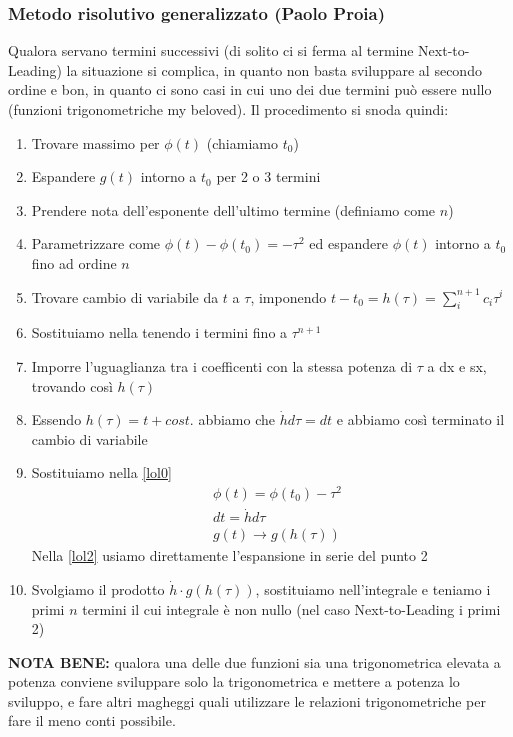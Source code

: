 \subsubsection{Metodo risolutivo generalizzato (Paolo Proia)}

Qualora servano termini successivi (di solito ci si ferma al termine Next-to-Leading) la situazione si complica, in quanto non basta sviluppare al secondo ordine e bon, in quanto ci sono casi in cui uno dei due termini può essere nullo (funzioni trigonometriche my beloved). Il procedimento si snoda quindi:
\begin{enumerate}
	\item Trovare massimo per \(\phi(t)\) (chiamiamo \(t_0\))
	\item Espandere \(g(t)\) intorno a \(t_0\) per 2 o 3 termini
	\item Prendere nota dell'esponente dell'ultimo termine (definiamo come  \(n\)) 
	\item Parametrizzare come $\phi(t) - \phi(t_0)=-\tau^2 \label{lol1}$
	ed espandere \(\phi(t)\) intorno a $t_0$ fino ad ordine \(n\)
	\item Trovare cambio di variabile da \(t\) a \(\tau\), imponendo $t - t_0 = h(\tau) = \sum_i^{n+1} c_i \tau^i$
	\item Sostituiamo nella  tenendo i termini fino a \(\tau^{n+1}\)
	\item Imporre l'uguaglianza tra i coefficenti con la stessa potenza di \(\tau\) a dx e sx, trovando così \(h(\tau)\)
	\item Essendo \(h(\tau) = t + cost. \) abbiamo che \(\dot{h}d\tau = dt\) e abbiamo così terminato il cambio di variabile
	\item Sostituiamo nella \ref{lol0}
	\begin{align}
		&\phi(t) = \phi(t_0) - \tau^2\\
		&dt=\dot{h}d\tau\\
		&g(t) \to g(h(\tau)) \label{lol2}
	\end{align}
	Nella \ref{lol2} usiamo direttamente l'espansione in serie del punto 2
	\item Svolgiamo il prodotto \(\dot{h} \cdot g(h(\tau))\), sostituiamo nell'integrale e teniamo i primi $n$ termini il cui integrale è non nullo (nel caso Next-to-Leading i primi 2)
\end{enumerate}

\textbf{NOTA BENE:} qualora una delle due funzioni sia una trigonometrica elevata a potenza conviene sviluppare solo la trigonometrica e mettere a potenza lo sviluppo, e fare altri magheggi
quali utilizzare le relazioni trigonometriche per fare il meno conti possibile.

